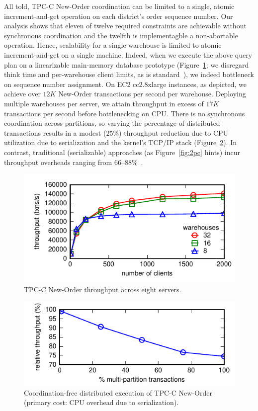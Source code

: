 All told, TPC-C New-Order coordination can be limited to a single,
atomic increment-and-get operation on each district's order sequence
number. Our \cfreedom analysis shows that eleven of twelve required
constraints are achievable without synchronous coordination and the
twelfth is implementagble a non-abortable operation. Hence,
scalability for a single warehouse is limited to atomic
increment-and-get on a single machine. Indeed, when we execute the
above query plan on a linearizable main-memory database prototype
(Figure~\ref{fig:clients}; we disregard think time and per-warehouse
client limits, as is
standard~\cite{calvin,hstore,abadi-vll,jones-dtxn}), we indeed
bottleneck on sequence number assignment. On EC2 cc2.8xlarge
instances, as depicted, we achieve over $12K$ New-Order transactions
per second per warehouse. Deploying multiple warehouses per server, we
attain throughput in excess of $17K$ transactions per second before
bottlenecking on CPU. There is no synchronous coordination across
partitions, so varying the percentage of distributed transactions
results in a modest ($25\%$) throughput reduction due to CPU
utilization due to serialization and the kernel's TCP/IP stack
(Figure~\ref{fig:pct}). In contrast, traditional (serializable)
approaches (as Figure~\ref{fig:2pc} hints) incur throughput overheads
ranging from 66--88\%~\cite{abadi-vll}.

\begin{figure}
\includegraphics[width=\columnwidth]{figs/wh_thru.pdf}\vspace{-1em}
\caption{TPC-C New-Order throughput across eight servers.}
\label{fig:clients}
\end{figure}

\begin{figure}
\includegraphics[width=\columnwidth]{figs/pct_thru.pdf}\vspace{-1em}
\caption{Coordination-free distributed execution of TPC-C New-Order
  (primary cost: CPU overhead due to serialization).}
\label{fig:pct}
\end{figure}

